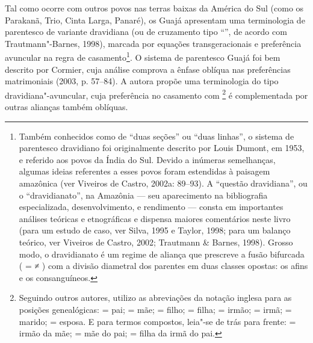 Tal como ocorre com outros povos nas terras baixas da América do Sul
(como os Parakanã, Trio, Cinta Larga, Panaré), os Guajá apresentam uma
terminologia de parentesco de variante dravidiana (ou de cruzamento tipo
``'', de acordo com Trautmann"-Barnes, 1998), marcada por equações
transgeracionais e preferência avuncular na regra de casamento\footnote{Também
  conhecidos como de ``duas seções'' ou ``duas linhas'', o sistema de
  parentesco dravidiano foi originalmente descrito por Louis Dumont, em
  1953, e referido aos povos da Índia do Sul. Devido a inúmeras
  semelhanças, algumas ideias referentes a esses povos foram estendidas
  à paisagem amazônica (ver Viveiros de Castro, 2002a: 89--93). A
  ``questão dravidiana'', ou o ``dravidianato'', na Amazônia --- seu
  aparecimento na bibliografia especializada, desenvolvimento, e
  rendimento --- consta em importantes análises teóricas e etnográficas e
  dispensa maiores comentários neste livro (para um estudo de caso, ver
  Silva, 1995 e Taylor, 1998; para um balanço teórico, ver Viveiros de
  Castro, 2002; Trautmann \& Barnes, 1998). Grosso modo, o dravidianato
  é um regime de aliança que prescreve a fusão bifurcada ( =  ≠ )
  com a divisão diametral dos parentes em duas classes opostas: os afins
  e os consanguíneos.}. O sistema de parentesco Guajá foi bem descrito
por Cormier, cuja análise comprova a ênfase oblíqua nas preferências
matrimoniais (2003, p. 57--84). A autora propõe uma terminologia do tipo
dravidiana"-avuncular, cuja preferência no casamento com \footnote{Seguindo
  outros autores, utilizo as abreviações da notação inglesa para as
  posições genealógicas:  = pai;  = mãe;  = filho;  = filha;  =
  irmão;  = irmã;  = marido;  = esposa. E para termos compostos,
  leia"-se de trás para frente:  = irmão da mãe;  = mãe do pai;  =
  filha da irmã do pai.} é complementada por outras alianças também
oblíquas.

